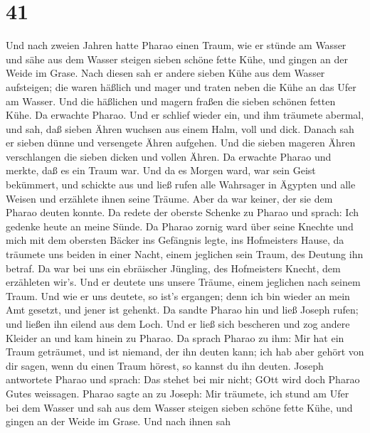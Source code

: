 \hypertarget{section-40}{%
\section{41}\label{section-40}}

 Und nach zweien Jahren hatte Pharao einen Traum, wie er
stünde am Wasser  und sähe aus dem Wasser steigen sieben
schöne fette Kühe, und gingen an der Weide im Grase.  Nach
diesen sah er andere sieben Kühe aus dem Wasser aufsteigen; die waren
häßlich und mager und traten neben die Kühe an das Ufer am Wasser.
 Und die häßlichen und magern fraßen die sieben schönen
fetten Kühe. Da erwachte Pharao.  Und er schlief wieder ein,
und ihm träumete abermal, und sah, daß sieben Ähren wuchsen aus einem
Halm, voll und dick.  Danach sah er sieben dünne und
versengete Ähren aufgehen.  Und die sieben mageren Ähren
verschlangen die sieben dicken und vollen Ähren. Da erwachte Pharao und
merkte, daß es ein Traum war.  Und da es Morgen ward, war
sein Geist bekümmert, und schickte aus und ließ rufen alle Wahrsager in
Ägypten und alle Weisen und erzählete ihnen seine Träume. Aber da war
keiner, der sie dem Pharao deuten konnte.  Da redete der
oberste Schenke zu Pharao und sprach: Ich gedenke heute an meine Sünde.
 Da Pharao zornig ward über seine Knechte und mich mit dem
obersten Bäcker ins Gefängnis legte, ins Hofmeisters Hause,
 da träumete uns beiden in einer Nacht, einem jeglichen
sein Traum, des Deutung ihn betraf.  Da war bei uns ein
ebräischer Jüngling, des Hofmeisters Knecht, dem erzähleten wir's. Und
er deutete uns unsere Träume, einem jeglichen nach seinem Traum.
 Und wie er uns deutete, so ist's ergangen; denn ich bin
wieder an mein Amt gesetzt, und jener ist gehenkt.  Da
sandte Pharao hin und ließ Joseph rufen; und ließen ihn eilend aus dem
Loch. Und er ließ sich bescheren und zog andere Kleider an und kam
hinein zu Pharao.  Da sprach Pharao zu ihm: Mir hat ein
Traum geträumet, und ist niemand, der ihn deuten kann; ich hab aber
gehört von dir sagen, wenn du einen Traum hörest, so kannst du ihn
deuten.  Joseph antwortete Pharao und sprach: Das stehet
bei mir nicht; GOtt wird doch Pharao Gutes weissagen. 
Pharao sagte an zu Joseph: Mir träumete, ich stund am Ufer bei dem
Wasser  und sah aus dem Wasser steigen sieben schöne fette
Kühe, und gingen an der Weide im Grase.  Und nach ihnen sah
